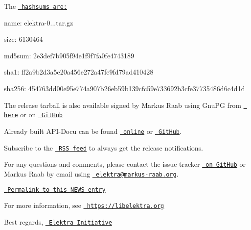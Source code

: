 The \href{https://github.com/ElektraInitiative/ftp/blob/master/releases/elektra-0.8.24.tar.gz.hashsum?raw=true}{\texttt{ hashsums are\+:}}


\begin{DoxyItemize}
\item name\+: elektra-\/0...\+tar.\+gz
\item size\+: 6130464
\item md5sum\+: 2e3def7b905f94e1f9f7fa0fe4743189
\item sha1\+: ff2a9b2d3a5e20a456e272a47fe9fd79ad410428
\item sha256\+: 454763dd00e95e774a907b26eb59b139cfc59e733692b3cfe37735486d6c4d1d
\end{DoxyItemize}

The release tarball is also available signed by Markus Raab using Gnu\+PG from \href{https://www.libelektra.org/ftp/elektra/releases/elektra-0.8.24.tar.gz.gpg}{\texttt{ here}} or on \href{https://github.com/ElektraInitiative/ftp/blob/master/releases//elektra-0.8.24.tar.gz.gpg?raw=true}{\texttt{ Git\+Hub}}

Already built A\+P\+I-\/\+Docu can be found \href{https://doc.libelektra.org/api/0.8.24/html/}{\texttt{ online}} or \href{https://github.com/ElektraInitiative/doc/tree/master/api/0.8.24}{\texttt{ Git\+Hub}}.

Subscribe to the \href{https://www.libelektra.org/news/feed.rss}{\texttt{ R\+SS feed}} to always get the release notifications.

For any questions and comments, please contact the issue tracker \href{http://issues.libelektra.org}{\texttt{ on Git\+Hub}} or Markus Raab by email using \href{mailto:elektra@markus-raab.org}{\texttt{ elektra@markus-\/raab.\+org}}.

\href{https://www.libelektra.org/news/0.8.24-release}{\texttt{ Permalink to this N\+E\+WS entry}}

For more information, see \href{https://libelektra.org}{\texttt{ https\+://libelektra.\+org}}

Best regards, \href{https://www.libelektra.org/developers/authors}{\texttt{ Elektra Initiative}} 